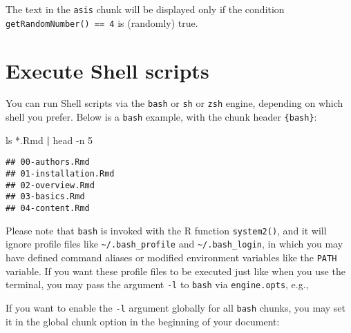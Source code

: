 \documentclass[
  11pt,
]{krantz}
\newenvironment{Shaded}{\begin{snugshade}}{\end{snugshade}}
\newcommand{\BaseNTok}[1]{\textcolor[rgb]{0.06,0.06,0.06}{#1}}
\newcommand{\DataTypeTok}[1]{\textcolor[rgb]{0.27,0.27,0.27}{#1}}
\newcommand{\FunctionTok}[1]{\textcolor[rgb]{0,0,0}{#1}}
\newcommand{\KeywordTok}[1]{\textcolor[rgb]{0.27,0.27,0.27}{\textbf{#1}}}
\newcommand{\NormalTok}[1]{#1}
\newcommand{\OperatorTok}[1]{\textcolor[rgb]{0.43,0.43,0.43}{\textbf{#1}}}
\newcommand{\StringTok}[1]{\textcolor[rgb]{0.5,0.5,0.5}{#1}}
\begin{document}
The text in the \texttt{asis} chunk will be displayed only if the condition \texttt{getRandomNumber()\ ==\ 4} is (randomly) true.

\hypertarget{eng-bash}{%
\section{Execute Shell scripts}\label{eng-bash}}

You can run Shell scripts via the \texttt{bash} or \texttt{sh} or \texttt{zsh} engine, depending on which shell you prefer. Below is a \texttt{bash} example, with the chunk header \texttt{\textasciigrave{}\textasciigrave{}\textasciigrave{}\{bash\}}:

\begin{Shaded}
\begin{Highlighting}[]
\FunctionTok{ls}\NormalTok{ *.Rmd }\KeywordTok{|} \FunctionTok{head}\NormalTok{ -n 5}
\end{Highlighting}
\end{Shaded}

\begin{verbatim}
## 00-authors.Rmd
## 01-installation.Rmd
## 02-overview.Rmd
## 03-basics.Rmd
## 04-content.Rmd
\end{verbatim}

Please note that \texttt{bash} is invoked with the R function \texttt{system2()}, and it will ignore profile files like \texttt{\textasciitilde{}/.bash\_profile} and \texttt{\textasciitilde{}/.bash\_login}, in which you may have defined command aliases or modified environment variables like the \texttt{PATH} variable. If you want these profile files to be executed just like when you use the terminal, you may pass the argument \texttt{-l} to \texttt{bash} via \texttt{engine.opts}, e.g.,

\begin{Shaded}
\end{Shaded}

If you want to enable the \texttt{-l} argument globally for all \texttt{bash} chunks, you may set it in the global chunk option in the beginning of your document:

\begin{Shaded}
\end{Shaded}
\end{document}
